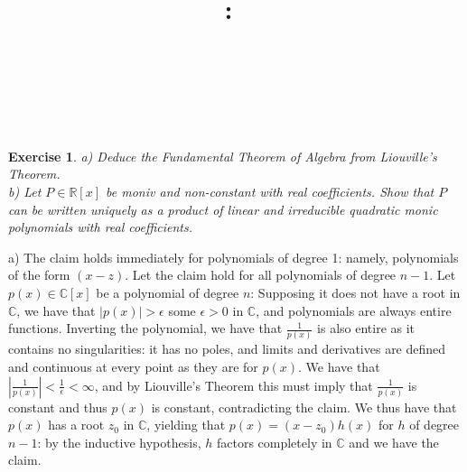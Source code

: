 \documentclass{article}
\title{
    \vspace{2in}
    \textmd{\textbf{\hmwkClass:\ \hmwkTitle}}\\
    \vspace{0.1in}
    \textmd{\hmwkDueDate} \\
    \vspace{0.2in}\large{\textit{\hmwkClassInstructor\  }}
    \vspace{2in}
}
\author{\hmwkAuthorName}
\date{}
\newcommand{\bb}[1]{\mathbb{#1}}
\newtheorem{exercise}{Exercise}
\begin{document}
\maketitle
\newpage
\begin{exercise}
  a) Deduce the Fundamental Theorem of Algebra from Liouville's Theorem. \\
  b) Let $P \in \bb{R}[x]$ be moniv and non-constant with real coefficients. Show that $P$ can be written uniquely as a product of linear and irreducible quadratic monic polynomials with real coefficients.
\end{exercise}
a) The claim holds immediately for polynomials of degree 1: namely, polynomials of the form $(x-z)$. Let the claim hold for all polynomials of degree $n-1$. Let $p(x) \in \bb{C}[x]$ be a polynomial of degree $n$: Supposing it does not have a root in $\bb{C}$, we have that $|p(x)| > \epsilon$ some $\epsilon>0$ in $\bb{C}$, and polynomials are always entire functions. Inverting the polynomial, we have that $\frac{1}{p(x)}$ is also entire as it contains no singularities: it has no poles, and limits and derivatives are defined and continuous at every point as they are for $p(x)$. We have that $|\frac{1}{p(x)}| < \frac{1}{\epsilon} < \infty$, and by Liouville's Theorem this must imply that $\frac{1}{p(x)}$ is constant and thus $p(x)$ is constant, contradicting the claim. We thus have that $p(x)$ has a root $z_{0}$ in $\bb{C}$, yielding that $p(x) = (x - z_{0})h(x)$ for $h$ of degree $n-1$: by the inductive hypothesis, $h$ factors completely in $\bb{C}$ and we have the claim. \\
\end{document}
